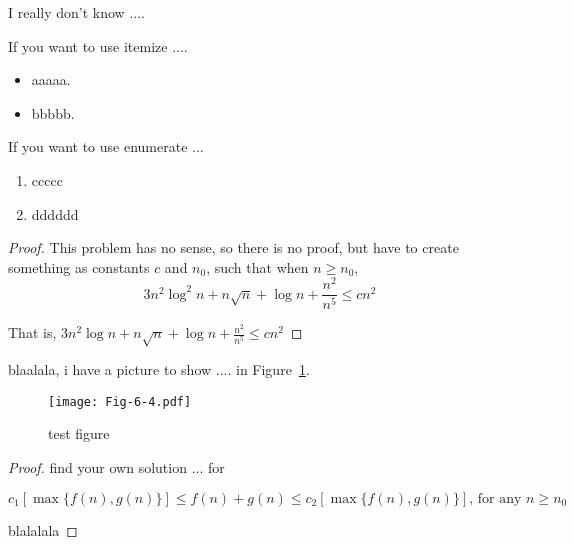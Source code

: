 \documentclass[11pt]{article}
\begin{document}

\newpage


\bigskip
{}
I really don't know ....

If you want to use itemize ....
\begin{itemize}
\item aaaaa. 
\item bbbbb.
\end{itemize}


If you want to use enumerate ...

\begin{enumerate}
\item ccccc
\item dddddd
\end{enumerate}

\bigskip



\begin{proof}
This problem has no sense, so there is no proof, but have to create
something
as constants $c$ and $n_0$,
  such that when $n\geq n_0$,
$$
3n^2\log^2 n+n\sqrt{n}+\log n + \frac{n^2}{n^5}\leq c n^2
$$

That is, 
$
3n^2\log n+n\sqrt{n}+\log n + \frac{n^2}{n^5}\leq c n^2
$
\end{proof}

\bigskip



blaalala, i have a picture to show .... in Figure~\ref{fig:test}.

\begin{figure}[h!]
\begin{center}
\texttt{[image: Fig-6-4.pdf]}
\caption{test figure}
\label{fig:test}
\end{center}
\end{figure}

\bigskip


\begin{proof}
find your own solution ... for 
 
$$c_1[\max\{f(n), g(n)\}]\leq f(n)+g(n) \leq c_2[\max\{f(n), g(n)\}] 
\textrm{, for any }
n\geq n_0$$

blalalala

\end{proof}
\end{document}
